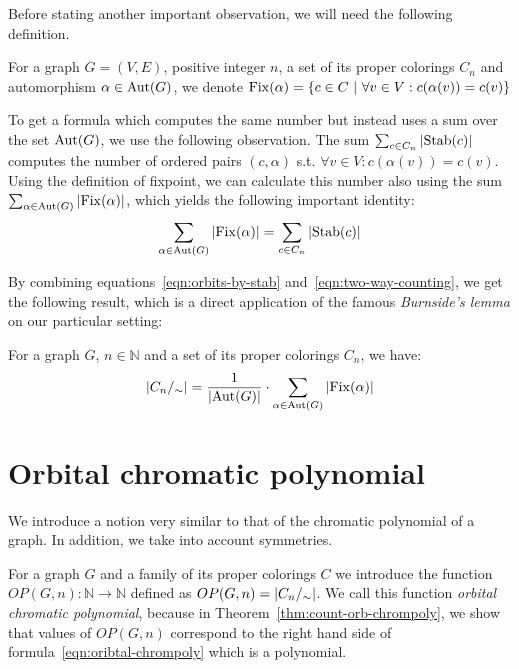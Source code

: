 Before stating another important observation, we will need the following definition.

\begin{defn}[fixpoint]
    For a graph $G = (V,E)$, positive integer $n$, a set of its proper colorings $C_n$ and automorphism $\alpha \in \operatorname{Aut}(G)$, we denote $\operatorname{Fix}(\alpha)= \{ c \in C \ | \ \forall v \in V : c(\alpha(v)) = c(v) \}$
\end{defn}

To get a formula which computes the same number but instead uses a sum over the set $\operatorname{Aut}(G)$, we use the following observation. The sum $\sum_{c \in C_n} \left|{\operatorname{Stab}(c)}\right|$ computes the number of ordered pairs $(c,\alpha)$ s.t. $\forall v \in V : c(\alpha(v)) = c(v)$. Using the definition of fixpoint, we can calculate this number also using the sum $\sum_{\alpha \in \operatorname{Aut}(G)} \left|{\operatorname{Fix}(\alpha)}\right|$, which yields the following important identity:
\begin{equation}\label{eqn:two-way-counting}
    \sum_{\alpha \in \operatorname{Aut}(G)} \left|{\operatorname{Fix}(\alpha)}\right| = \sum_{c \in C_n}\left|{\operatorname{Stab}(c)}\right|    
\end{equation}

By combining equations~\ref{eqn:orbits-by-stab} and~\ref{eqn:two-way-counting}, we get the following result, which is a direct application of the famous \textit{Burnside's lemma} on our particular setting:

\begin{thm} \label{thm:burnside}
    For a graph $G$, $n \in \mathbb{N}$ and a set of its proper colorings $C_n$, we have: $$\left|{C_n/_\sim}\right| = \frac{1}{\left|{\operatorname{Aut}(G)}\right|}\cdot \sum_{\alpha \in \operatorname{Aut}(G)}\left|{\operatorname{Fix}(\alpha)}\right|$$
\end{thm}

\section{Orbital chromatic polynomial}

We introduce a notion very similar to that of the chromatic polynomial of a graph. In addition, we take into account symmetries.


\begin{defn}
    For a graph $G$ and a family of its proper colorings $C$ we introduce the function $OP(G,n): \mathbb{N}\to \mathbb{N}$ defined as $
    OP(G,n)=\left|{C_n/_\sim}\right|$. We call this function \emph{orbital chromatic polynomial}, because 
    in Theorem~\ref{thm:count-orb-chrompoly}, we show that values of $OP(G,n)$ 
    correspond to the right hand side of formula~\ref{eqn:oribtal-chrompoly} which is a polynomial.
\end{defn}

